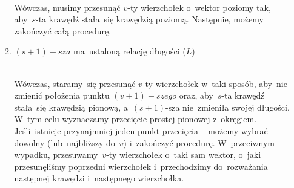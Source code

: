 \documentclass[11pt, a4paper]{article}
\begin{document}
\begin{enumerate}
\begin{enumerate}
 \\
       Wówczas, musimy przesunąć $v$-ty wierzchołek o~wektor poziomy tak, aby~$s$-ta krawędź stała~się krawędzią poziomą.
       Następnie, możemy zakończyć całą procedurę.
     \item \hypertarget{VerLen}{$(s+1)-sza$ ma~ustaloną relację długości ($L$)} \\
     Wówczas, staramy~się przesunąć $v$-ty wierzchołek w~taki sposób, aby~nie zmienić położenia punktu $(v+1)-szego$
     oraz, aby~$s$-ta krawędź stała~się krawędzią pionową, a~$(s+1)$-sza nie~zmieniła swojej długości. W~tym celu wyznaczamy
     przecięcie prostej pionowej z~okręgiem. Jeśli~istnieje przynajmniej jeden punkt przecięcia -- możemy wybrać dowolny
     (lub~najbliższy do~$v$) i~zakończyć procedurę. W~przeciwnym wypadku, przesuwamy~$v$-ty wierzchołek o~taki sam wektor,
     o~jaki przesunęliśmy poprzedni wierzchołek i~przechodzimy do~rozważania następnej krawędzi i~następnego wierzchołka. \\
\end{enumerate}
\end{enumerate}
\end{document}
